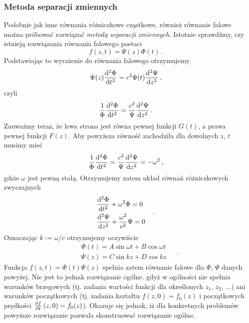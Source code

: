 \documentclass[../main.tex]{subfiles}
\begin{document}
        \subsubsection{Metoda separacji zmiennych}
        Podobnie jak inne równania różniczkowe cząstkowe, również równanie falowe można próbować
        rozwiązać \textit{metodą separacji zmiennych}. Istotnie sprawdźmy, czy istnieją rozwiązania
        równania falowego postaci
        \begin{equation*}
            f(z,t)=\Psi(z)\Phi(t)\,.
        \end{equation*}
        Podstawiając to wyrażenie do równania falowego otrzymujemy
        \begin{equation*}
            \Psi(z)\dv[2]{\Phi}{t}=c^2\Phi(t)\dv[2]{\Psi}{z}\,,
        \end{equation*}
        czyli
        \begin{equation*}
            \frac{1}{\Phi}\dv[2]{\Phi}{t}=\frac{c^2}{\Psi}\dv[2]{\Psi}{z}\,.
        \end{equation*}
        Zauważmy teraz, że lewa strona jest równa pewnej funkcji \(G(t)\), a prawa pewnej funkcji
        \(F(z)\). Aby powyższa równość zachodziła dla dowolnych \(z\), \(t\) musimy mieć
        \begin{equation*}
            \frac{1}{\Phi}\dv[2]{\Phi}{t}=\frac{c^2}{\Psi}\dv[2]{\Psi}{z}=-\omega^2\,,
        \end{equation*}
        gdzie \(\omega\) jest pewną stałą. Otrzymujemy zatem układ równań różniczkowych zwyczajnych
        \begin{equation*}
            \begin{split}
                &\dv[2]{\Phi}{t}+\omega^2\Phi=0\\
                &\dv[2]{\Psi}{z}+\frac{\omega^2}{c^2}\Psi=0
            \end{split}\quad\,.
        \end{equation*}
        Oznaczając \(k:=\omega/c\) otrzymujemy oczywiście
        \begin{equation*}
            \begin{split}
                &\Phi(t)=A\sin\omega t+B\cos\omega t\\
                &\Psi(z)=C\sin kz+D\cos kz
            \end{split}\quad\,.
        \end{equation*}
        Funkcja \(f(z,t)=\Phi(t)\Psi(z)\) spełnia zatem równanie falowe dla \(\Phi\), \(\Psi\)
        danych powyżej. Nie jest to jednak rozwiązanie ogólne. gdyż w ogólności nie spełnia warunków
        brzegowych (tj. zadania wartości funkcji dla określonych \(z_1\), \(z_2\), ...) ani warunków
        początkowych (tj. zadania kształtu \(f(z,0)=f_0(z)\) i początkowych prędkości
        \(\pdv{f}{t}\,(z,0)=\dot{f}_0(z)\)). Okazuje się jednak, iż dla konkretnych problemów
        powyższe rozwiązanie pozwala skonstruować rozwiązanie ogólne.
\end{document}
